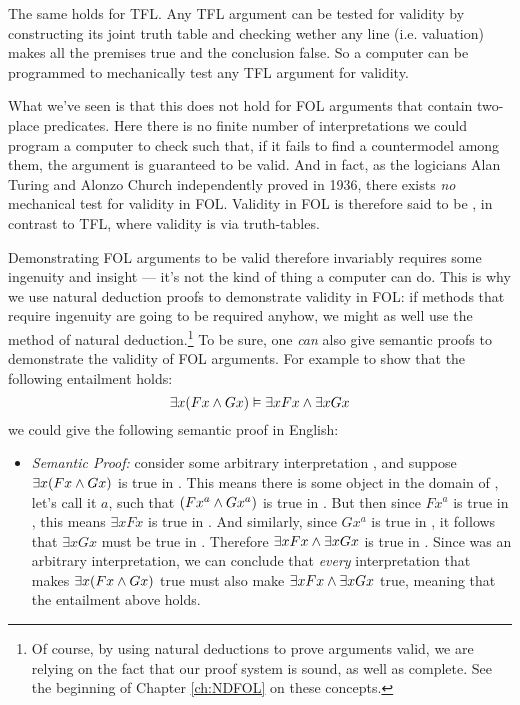 The same holds for TFL.  Any TFL argument can be tested for validity by constructing its joint truth table and checking wether any line (i.e. valuation) makes all the premises true and the conclusion false.  So a computer can be programmed to mechanically test any TFL argument for validity.

What we've seen is that this does not hold for FOL arguments that contain two-place predicates.  Here there is no finite number of interpretations we could program a computer to check such that, if it fails to find a countermodel among them, the argument is guaranteed to be valid.  And in fact, as the logicians Alan Turing and Alonzo Church independently proved in 1936, there exists \emph{no} mechanical test for validity in FOL. Validity in FOL is therefore said to be , in contrast to TFL, where validity is  via truth-tables.


Demonstrating FOL arguments to be valid therefore invariably requires some ingenuity and insight --- it's not the kind of thing a computer can do. This is why we use natural deduction proofs to demonstrate validity in FOL: if methods that require ingenuity are going to be required anyhow, we might as well use the method of natural deduction.\footnote{Of course, by using natural deductions to prove arguments valid, we are relying on the fact that our proof system is sound, as well as complete.  See the beginning of Chapter \ref{ch:NDFOL} on these concepts.}
To be sure, one \emph{can} also give semantic proofs to demonstrate the validity of FOL arguments.  For example to show that the following entailment holds:
$$\exists x(Fx \wedge Gx) \vDash \exists x Fx \wedge \exists xGx$$
we could give the following semantic proof in English:

\begin{itemize}
\item[] \emph{Semantic Proof:} consider some arbitrary interpretation , and suppose $\exists x(Fx \wedge Gx)$ is true in .  This means there is some object in the domain of , let's call it $a$, such that $(Fx^a \wedge Gx^a)$ is true in .  But then since $Fx^a$ is true in , this means $\exists xFx$ is true in .  And similarly, since $Gx^a$ is true in , it follows that $\exists xGx$ must be true in .  Therefore $\exists x Fx \wedge \exists xGx$ is true in .  Since  was an arbitrary interpretation, we can conclude that \emph{every} interpretation that makes $\exists x(Fx \wedge Gx)$ true must also make $\exists x Fx \wedge \exists xGx$ true, meaning that the entailment above holds.
\end{itemize}

